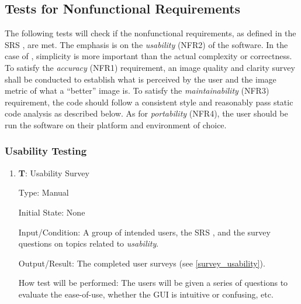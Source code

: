\documentclass[12pt, titlepage]{article}
\newcounter{testnum} %
\begin{document}
\subsection{Tests for Nonfunctional Requirements} \label{sec_NFR_tests}

The following tests will check if the nonfunctional requirements, as defined in the SRS \citep{SRS}, are 
met. The emphasis is on the \textit{usability} (NFR2) of the software. In the case of \progname{}, 
simplicity is more important than the actual complexity or correctness.
To satisfy the \textit{accuracy} (NFR1) requirement, an image quality and clarity survey shall be
conducted to establish what is perceived by the user and the image metric of what 
a ``better'' image is. To satisfy the \textit{maintainability} (NFR3) requirement, the code should 
follow a consistent style and reasonably pass static code analysis as described below.
As for \textit{portability} (NFR4), the user should be run the software on their platform and 
environment of choice.

\subsubsection{Usability Testing}
\begin{enumerate}

  \item{\textbf{T\thetestnum \label{T_surveyUsability}}: Usability Survey\\}

  Type: Manual
            
  Initial State: None
            
  Input/Condition: A group of intended users, the SRS \citep{SRS}, and 
  the survey questions on topics related to \textit{usability}.
            
  Output/Result: The completed user surveys (see \ref{survey_usability}).
            
  How test will be performed: The users will be given a series of questions to evaluate the 
  ease-of-use, whether the GUI is intuitive or confusing, etc.

\end{enumerate}
\end{document}

